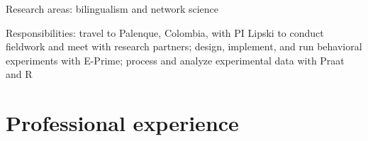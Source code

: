 \documentclass[11pt,a4paper,]{awesome-cv}
\begin{document}
\begin{cventries}
{\begin{cvitems}
\item Research areas: bilingualism and network science
\item Responsibilities: travel to Palenque, Colombia, with PI Lipski to conduct fieldwork and meet with research partners; design, implement, and run behavioral experiments with E-Prime; process and analyze experimental data with Praat and R
\end{cvitems}}
\end{cventries}

\hypertarget{professional-experience}{%
\section{Professional experience}\label{professional-experience}}
\end{document}
